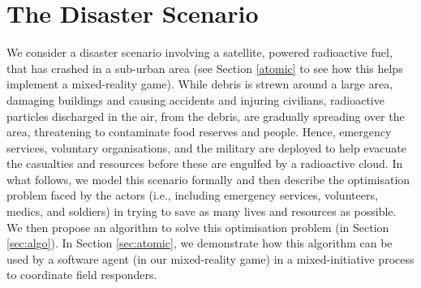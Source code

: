 \section{The Disaster Scenario}

\noindent We consider a disaster scenario involving a satellite, powered radioactive fuel, that has crashed in a sub-urban area (see Section \ref{atomic} to see how this helps implement a  mixed-reality game). While debris is strewn around a large area, damaging buildings and causing accidents and injuring civilians, radioactive particles discharged in the air, from the debris, are gradually spreading over the area, threatening to contaminate food reserves and people. Hence, emergency services, voluntary organisations, and the military are deployed to help evacuate the casualties and resources before these are engulfed by a radioactive cloud.  In what follows, we model this scenario formally and then describe the optimisation problem faced by the actors  (i.e., including emergency services, volunteers, medics, and soldiers) in trying to save as many lives and resources as possible.  We then propose an algorithm to solve this optimisation problem (in Section \ref{sec:algo}). In Section \ref{sec:atomic}, we demonstrate how this algorithm can be used by a software agent (in our mixed-reality game) in a mixed-initiative process to coordinate field responders. 

